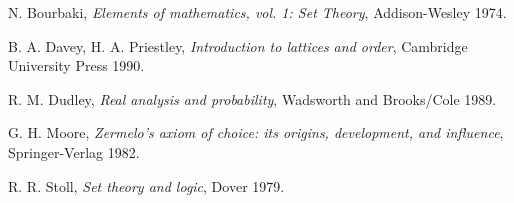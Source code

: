 \begin{thebibliography}{99}

 N. Bourbaki, {\em Elements of mathematics, vol. 1: Set
Theory}, Addison-Wesley 1974.

 B. A. Davey, H. A. Priestley, {\em Introduction to lattices and
order}, Cambridge University Press 1990.

 R. M. Dudley, {\em Real analysis and probability},
Wadsworth and Brooks/Cole 1989.

 G. H. Moore, {\em Zermelo's axiom of choice: its origins,
development, and influence}, Springer-Verlag 1982.

 R. R. Stoll, {\em Set theory and logic}, Dover 1979.

\end{thebibliography}
